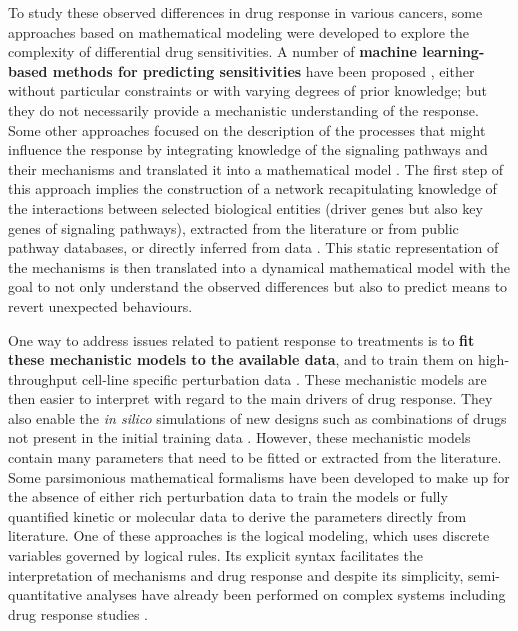 \documentclass[a4paper,12pt,twoside,onecolumn,openright,final,oldfontcommands]{memoir}
\begin{document}
To study these observed differences in drug response in various cancers,
some approaches based on mathematical modeling were developed to explore
the complexity of differential drug sensitivities. A number of
\textbf{machine learning-based methods for predicting sensitivities}
have been proposed \citep{costello2014community}, either without
particular constraints or with varying degrees of prior knowledge; but
they do not necessarily provide a mechanistic understanding of the
response. Some other approaches focused on the description of the
processes that might influence the response by integrating knowledge of
the signaling pathways and their mechanisms and translated it into a
mathematical model
\citep{eduati2017drug, jastrzebski2018integrative, frohlich2018efficient}.
The first step of this approach implies the construction of a network
recapitulating knowledge of the interactions between selected biological
entities (driver genes but also key genes of signaling pathways),
extracted from the literature or from public pathway databases, or
directly inferred from data \citep{verny2017learning}. This static
representation of the mechanisms is then translated into a dynamical
mathematical model with the goal to not only understand the observed
differences \citep{jastrzebski2018integrative} but also to predict means
to revert unexpected behaviours.

One way to address issues related to patient response to treatments is
to \textbf{fit these mechanistic models to the available data}, and to
train them on high-throughput cell-line specific perturbation data
\citep{eduati2017drug, jastrzebski2018integrative, klinger2013network}.
These mechanistic models are then easier to interpret with regard to the
main drivers of drug response. They also enable the \emph{in silico}
simulations of new designs such as combinations of drugs not present in
the initial training data \citep{frohlich2018efficient}. However, these
mechanistic models contain many parameters that need to be fitted or
extracted from the literature. Some parsimonious mathematical formalisms
have been developed to make up for the absence of either rich
perturbation data to train the models or fully quantified kinetic or
molecular data to derive the parameters directly from literature. One of
these approaches is the logical modeling, which uses discrete variables
governed by logical rules. Its explicit syntax facilitates the
interpretation of mechanisms and drug response
\citep{zanudo2017network, iorio2016landscape} and despite its
simplicity, semi-quantitative analyses have already been performed on
complex systems including drug response studies
\citep{knijnenburg2016logic, eduati2020patient}.
\end{document}
